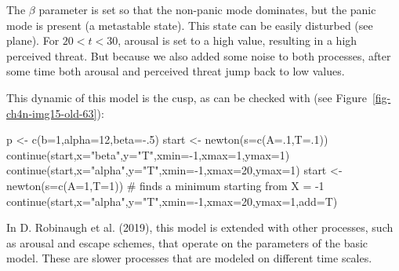 \documentclass[
  a4paper,
  DIV=11,
  numbers=noendperiod,
  oneside]{scrreprt}
\newenvironment{Shaded}{\begin{snugshade}}{\end{snugshade}}
\newcommand{\AttributeTok}[1]{\textcolor[rgb]{0.40,0.45,0.13}{#1}}
\newcommand{\CommentTok}[1]{\textcolor[rgb]{0.37,0.37,0.37}{#1}}
\newcommand{\DecValTok}[1]{\textcolor[rgb]{0.68,0.00,0.00}{#1}}
\newcommand{\FunctionTok}[1]{\textcolor[rgb]{0.28,0.35,0.67}{#1}}
\newcommand{\NormalTok}[1]{\textcolor[rgb]{0.00,0.23,0.31}{#1}}
\newcommand{\OtherTok}[1]{\textcolor[rgb]{0.00,0.23,0.31}{#1}}
\newcommand{\SpecialCharTok}[1]{\textcolor[rgb]{0.37,0.37,0.37}{#1}}
\newcommand{\StringTok}[1]{\textcolor[rgb]{0.13,0.47,0.30}{#1}}
\begin{document}
The \(\beta\) parameter is set so that the non-panic mode dominates, but
the panic mode is present (a metastable state). This state can be easily
disturbed (see plane). For \(20 < t < 30\), arousal is set to a high
value, resulting in a high perceived threat. But because we also added
some noise to both processes, after some time both arousal and perceived
threat jump back to low values.

This dynamic of this model is the cusp, as can be checked with (see
Figure~\ref{fig-ch4n-img15-old-63}):

\begin{Shaded}
\begin{Highlighting}[]
\NormalTok{p }\OtherTok{\textless{}{-}} \FunctionTok{c}\NormalTok{(}\AttributeTok{b=}\DecValTok{1}\NormalTok{,}\AttributeTok{alpha=}\DecValTok{12}\NormalTok{,}\AttributeTok{beta=}\SpecialCharTok{{-}}\NormalTok{.}\DecValTok{5}\NormalTok{)}
\NormalTok{start }\OtherTok{\textless{}{-}} \FunctionTok{newton}\NormalTok{(}\AttributeTok{s=}\FunctionTok{c}\NormalTok{(}\AttributeTok{A=}\NormalTok{.}\DecValTok{1}\NormalTok{,}\AttributeTok{T=}\NormalTok{.}\DecValTok{1}\NormalTok{)) }
\FunctionTok{continue}\NormalTok{(start,}\AttributeTok{x=}\StringTok{"beta"}\NormalTok{,}\AttributeTok{y=}\StringTok{"T"}\NormalTok{,}\AttributeTok{xmin=}\SpecialCharTok{{-}}\DecValTok{1}\NormalTok{,}\AttributeTok{xmax=}\DecValTok{1}\NormalTok{,}\AttributeTok{ymax=}\DecValTok{1}\NormalTok{) }
\FunctionTok{continue}\NormalTok{(start,}\AttributeTok{x=}\StringTok{"alpha"}\NormalTok{,}\AttributeTok{y=}\StringTok{"T"}\NormalTok{,}\AttributeTok{xmin=}\SpecialCharTok{{-}}\DecValTok{1}\NormalTok{,}\AttributeTok{xmax=}\DecValTok{20}\NormalTok{,}\AttributeTok{ymax=}\DecValTok{1}\NormalTok{) }
\NormalTok{start }\OtherTok{\textless{}{-}} \FunctionTok{newton}\NormalTok{(}\AttributeTok{s=}\FunctionTok{c}\NormalTok{(}\AttributeTok{A=}\DecValTok{1}\NormalTok{,}\AttributeTok{T=}\DecValTok{1}\NormalTok{)) }\CommentTok{\# finds a minimum starting from X = {-}1}
\FunctionTok{continue}\NormalTok{(start,}\AttributeTok{x=}\StringTok{"alpha"}\NormalTok{,}\AttributeTok{y=}\StringTok{"T"}\NormalTok{,}\AttributeTok{xmin=}\SpecialCharTok{{-}}\DecValTok{1}\NormalTok{,}\AttributeTok{xmax=}\DecValTok{20}\NormalTok{,}\AttributeTok{ymax=}\DecValTok{1}\NormalTok{,}\AttributeTok{add=}\NormalTok{T) }
\end{Highlighting}
\end{Shaded}

In D. Robinaugh et al. (2019), this model is extended with other
processes, such as arousal and escape schemes, that operate on the
parameters of the basic model. These are slower processes that are
modeled on different time scales.
\end{document}
